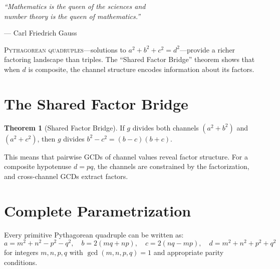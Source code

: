 \documentclass[11pt,twoside,openright]{book}
\theoremstyle{definition}
\newtheorem{theorem}{Theorem}[chapter]
\begin{document}
\epigraph{\itshape ``Mathematics is the queen of the sciences and\\
number theory is the queen of mathematics.''}
{--- Carl Friedrich Gauss}

\lettrine[lines=3]{P}{ythagorean quadruples}---solutions to
$a^2 + b^2 + c^2 = d^2$---provide a richer factoring landscape than triples.
The ``Shared Factor Bridge'' theorem shows that when $d$ is composite,
the channel structure encodes information about its factors.

\section{The Shared Factor Bridge}

\begin{theorem}[Shared Factor Bridge]
If $g$ divides both channels $(a^2+b^2)$ and $(a^2+c^2)$, then $g$
divides $b^2 - c^2 = (b-c)(b+c)$.
\end{theorem}

This means that pairwise GCDs of channel values reveal factor structure.
For a composite hypotenuse $d = pq$, the channels are constrained by
the factorization, and cross-channel GCDs extract factors.

\section{Complete Parametrization}

Every primitive Pythagorean quadruple can be written as:
\[
a = m^2 + n^2 - p^2 - q^2,\quad b = 2(mq+np),\quad
c = 2(nq - mp),\quad d = m^2 + n^2 + p^2 + q^2
\]
for integers $m, n, p, q$ with $\gcd(m,n,p,q) = 1$ and appropriate
parity conditions.

\begin{center}
\end{center}
\end{document}
